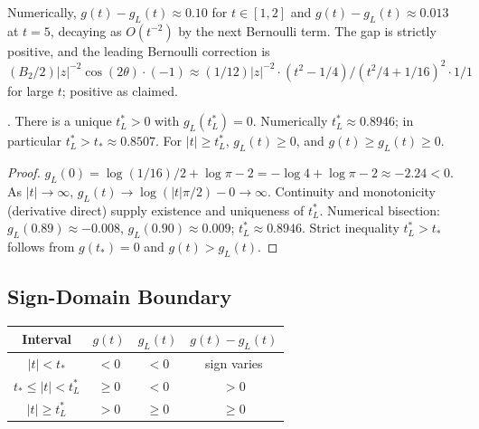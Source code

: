 \begin{remark}
\label{v4-arith:w7-e:rem:quantitative-gap}
Numerically, \(g(t)-g_{L}(t)\approx 0.10\) for \(t\in[1,2]\) and
\(g(t)-g_{L}(t)\approx 0.013\) at \(t=5\), decaying as \(O(t^{-2})\) by
the next Bernoulli term. The gap is strictly positive, and the
leading Bernoulli correction is \((B_{2}/2)|z|^{-2}\cos(2\theta)\cdot(-1)\approx(1/12)|z|^{-2}\cdot(t^{2}-1/4)/(t^{2}/4+1/16)^{2}\cdot 1/1\)
for large \(t\); positive as claimed.
\end{remark}

\begin{corollary}
\label{v4-arith:w7-e:cor:g-L-zero}
\ClaimStatusProvedHere. There is a unique \(t_{L}^{\ast}>0\) with
\(g_{L}(t_{L}^{\ast})=0\). Numerically \(t_{L}^{\ast}\approx 0.8946\);
in particular \(t_{L}^{\ast}>t_{\ast}\approx 0.8507\). For
\(|t|\geq t_{L}^{\ast}\), \(g_{L}(t)\geq 0\), and \(g(t)\geq g_{L}(t)\geq 0\).
\end{corollary}

\begin{proof}
\(g_{L}(0)=\log(1/16)/2+\log\pi-2=-\log 4+\log\pi-2\approx-2.24<0\).
As \(|t|\to\infty\), \(g_{L}(t)\to\log(|t|\pi/2)-0\to\infty\). Continuity
and monotonicity (derivative direct) supply existence and uniqueness
of \(t_{L}^{\ast}\). Numerical bisection: \(g_{L}(0.89)\approx-0.008\),
\(g_{L}(0.90)\approx 0.009\); \(t_{L}^{\ast}\approx 0.8946\).
Strict inequality \(t_{L}^{\ast}>t_{\ast}\) follows from \(g(t_{\ast})=0\)
and \(g(t)>g_{L}(t)\).
\end{proof}

\subsection{Sign-Domain Boundary}
\label{v4-arith:w7-e:sign-domain}

\begin{center}
\small
\begin{tabular}{c|ccc}
Interval & \(g(t)\) & \(g_{L}(t)\) & \(g(t)-g_{L}(t)\) \\\hline
\(|t|<t_{\ast}\) & \(<0\) & \(<0\) & sign varies \\
\(t_{\ast}\leq|t|<t_{L}^{\ast}\) & \(\geq 0\) & \(<0\) & \(>0\) \\
\(|t|\geq t_{L}^{\ast}\) & \(>0\) & \(\geq 0\) & \(\geq 0\) \\
\end{tabular}
\end{center}

